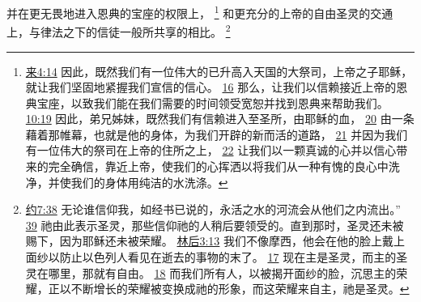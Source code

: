 \documentclass[12pt, a4paper, oneside]{ctexart}
\begin{document}
	并在更无畏地进入恩典的宝座的权限上，
	\footnote {
		\href{https://biblehub.com/hebrews/4-14.htm}{来4:14} 因此，既然我们有一位伟大的已升高入天国的大祭司，上帝之子耶稣，就让我们坚固地紧握我们宣信的信心。
		\href{https://biblehub.com/hebrews/4-16.htm}{16} 那么，让我们以信赖接近上帝的恩典宝座，以致我们能在我们需要的时间领受宽恕并找到恩典来帮助我们。
		\href{https://biblehub.com/hebrews/10-19.htm}{10:19} 因此，弟兄姊妹，既然我们有信赖进入至圣所，由耶稣的血，
		\href{https://biblehub.com/hebrews/10-20.htm}{20} 由一条藉着那帷幕，也就是他的身体，为我们开辟的新而活的道路，
		\href{https://biblehub.com/hebrews/10-21.htm}{21} 并因为我们有一位伟大的祭司在上帝的住所之上，
		\href{https://biblehub.com/hebrews/10-22.htm}{22} 让我们以一颗真诚的心并以信心带来的完全确信，靠近上帝，使我们的心挥洒以将我们从一种有愧的良心中洗净，并使我们的身体用纯洁的水洗涤。
	}
	和更充分的上帝的自由圣灵的交通上，与律法之下的信徒一般所共享的相比。
	\footnote {
		\href{https://biblehub.com/john/7-38.htm}{约7:38} 无论谁信仰我，如经书已说的，永活之水的河流会从他们之内流出。”
		\href{https://biblehub.com/john/7-39.htm}{39} 祂由此表示圣灵，那些信仰祂的人稍后要领受的。直到那时，圣灵还未被赐下，因为耶稣还未被荣耀。
		\href{https://biblehub.com/2_corinthians/3-13.htm}{林后3:13} 我们不像摩西，他会在他的脸上戴上面纱以防止以色列人看见在逝去的事物的末了。
		\href{https://biblehub.com/2_corinthians/3-17.htm}{17} 现在主是圣灵，而主的圣灵在哪里，那就有自由。
		\href{https://biblehub.com/2_corinthians/3-18.htm}{18} 而我们所有人，以被揭开面纱的脸，沉思主的荣耀，正以不断增长的荣耀被变换成祂的形象，而这荣耀来自主，祂是圣灵。
	}
\end{document}
